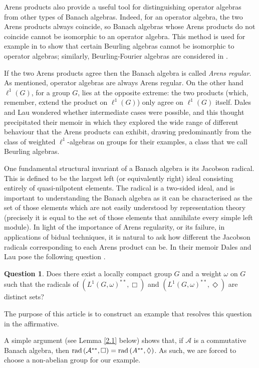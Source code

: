 \documentclass[twoside,11pt]{amsart}
\numberwithin{equation}{section}
\theoremstyle{definition}
\newtheorem{question}[theorem]{Question}
\newcommand {\A}{\mathcal A}
\newcommand{\rad}{{\rm rad\,}}
\newcommand{\1}{\mathbbm{1}}
\begin{document}
	Arens products also provide a useful tool for distinguishing operator algebras from other types of Banach algebras. Indeed, for an operator algebra, the two Arens products always coincide, so Banach algebras whose Arens products do not coincide cannot be isomorphic to an operator algebra. This method is used for example in \cite{LS} to show that certain Beurling algebras cannot be isomorphic to operator algebras; similarly, Beurling-Fourier algebras are considered in \cite{GLSS}.
	
	
	If the two Arens products agree then the Banach algebra is called 
	\textit{Arens regular}. As mentioned, operator algebras are always Arens regular. On the other hand $\ell^1(G)$, for a group $G$, lies at the opposite extreme: the two products (which, remember, extend the product on $\ell^1(G)$) only agree on $\ell^1(G)$ itself. Dales and Lau wondered whether intermediate cases were possible, and this thought precipitated their memoir \cite{DL} in which they explored the wide range of different behaviour that the Arens products can exhibit, drawing predominantly from the class of weighted $\ell^1$-algebras on groups for their examples, a class that we call Beurling algebras.
	
	One fundamental structural invariant of a Banach algebra is its Jacobson radical. This is defined to be the largest left (or equivalently right) ideal consisting entirely of quasi-nilpotent elements. The radical is a two-sided ideal, and is important to understanding the Banach algebra as it can be characterised as the set of those elements which are not easily understood by representation theory (precisely it is equal to the set of those elements that annihilate every simple left module). 
	In light of the importance of Arens regularity, or its failure, in applications of bidual techniques, it is natural to ask how different the Jacobson radicals corresponding to each Arens product can be.
	In their memoir Dales and Lau pose the following question \cite[Question 3, Chapter 14]{DL}.
	\begin{question} 		\label{Q1}
		Does there exist a locally compact group $G$ and a weight $\omega$ on $G$ such that the radicals of $(L^1(G, \omega)^{**}, \Box)$ and $(L^1(G, \omega)^{**}, \Diamond)$ are distinct sets? 
	\end{question}
	\noindent
	The purpose of this article is to construct an example that resolves this question in the affirmative. 
	
	A simple argument (see Lemma \ref{2.1} below) shows that, if $\A$ is a commutative Banach algebra, then $\rad(\A^{**}, \Box) = \rad(A^{**}, \Diamond)$. As such, we are forced to choose a non-abelian group for our example.	
	
\end{document}
